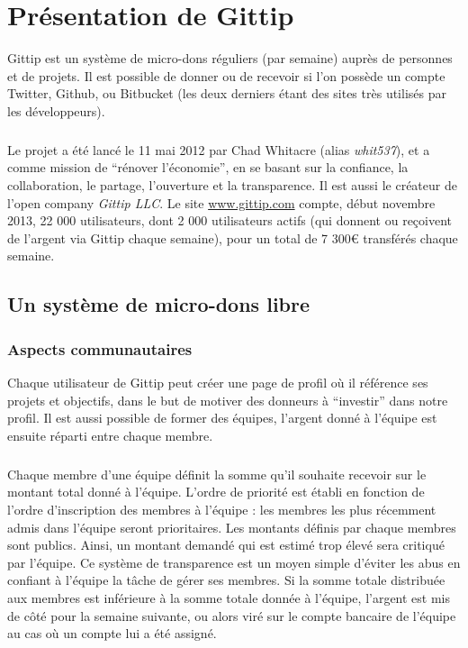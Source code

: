 \chapter{Présentation de Gittip}

Gittip est un système de micro-dons réguliers (par semaine) auprès de personnes
et de projets. Il est possible de donner ou de recevoir si l'on possède un
compte Twitter, Github, ou Bitbucket (les deux derniers étant des sites très
utilisés par les développeurs).

\paragraph{}
Le projet a été lancé le 11 mai 2012 par Chad Whitacre (alias \emph{whit537}),
et a comme mission de ``rénover l'économie'', en se basant sur la confiance, la
collaboration, le partage, l'ouverture et la transparence. Il est aussi le
créateur de l'open company \emph{Gittip LLC}. Le site \url{www.gittip.com}
compte, début novembre 2013, 22 000 utilisateurs, dont 2 000 utilisateurs
actifs (qui donnent ou reçoivent de l'argent via Gittip chaque semaine), pour
un total de 7 300\euro{} transférés chaque semaine.


    \section{Un système de micro-dons libre}

    \subsection{Aspects communautaires}

Chaque utilisateur de Gittip peut créer une page de profil où il référence ses
projets et objectifs, dans le but de motiver des donneurs à ``investir'' dans
notre profil. Il est aussi possible de former des équipes, l'argent donné à
l'équipe est ensuite réparti entre chaque membre.

\paragraph{}
Chaque membre d'une équipe définit la somme qu'il souhaite recevoir sur le
montant total donné à l'équipe. L'ordre de priorité est établi en fonction de
l'ordre d'inscription des membres à l'équipe : les membres les plus récemment
admis dans l'équipe seront prioritaires. Les montants définis par chaque
membres sont publics. Ainsi, un montant demandé qui est estimé trop élevé sera
critiqué par l'équipe. Ce système de transparence est un moyen simple d'éviter
les abus en confiant à l'équipe la tâche de gérer ses membres. Si la somme
totale distribuée aux membres est inférieure à la somme totale donnée à
l'équipe, l'argent est mis de côté pour la semaine suivante, ou alors viré sur
le compte bancaire de l'équipe au cas où un compte lui a été assigné.


